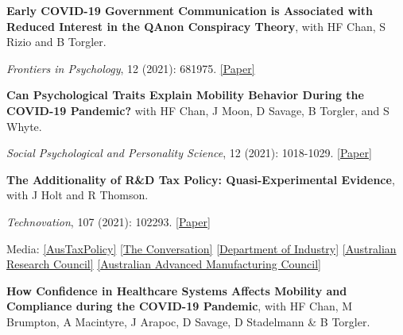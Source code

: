 \documentclass[letterpaper]{article}
\renewenvironment{itemize}{
  \begin{list}{}{
    \setlength{\leftmargin}{1.5em}
  }
}{
  \end{list}
}
\begin{document}
\begin{itemize}
\medskip

	\item \textbf{Early COVID-19 Government Communication is Associated with Reduced Interest in the QAnon Conspiracy Theory}, with HF Chan, S Rizio and B Torgler.
		\vspace{-0.05in}

		\item \textit{Frontiers in Psychology}, 12 (2021): 681975. \href{https://www.frontiersin.org/articles/10.3389/fpsyg.2021.681975/full}{[Paper]}

\medskip
	
		\item \textbf{Can Psychological Traits Explain Mobility Behavior During the COVID-19 Pandemic?} with HF Chan, J Moon, D Savage, B Torgler, and S Whyte. 
	\vspace{-0.05in}
		\item \textit{Social Psychological and Personality Science}, 12 (2021): 1018-1029.  \href{https://psyarxiv.com/5q3jv/}{[Paper]}

\medskip

\item			\textbf{The Additionality of R\&D Tax Policy: Quasi-Experimental Evidence}, with J Holt and R Thomson.  
\vspace{-0.05in}
\item \textit{Technovation}, 107 (2021): 102293. \href{https://doi.org/10.1016/j.technovation.2021.102293}{[Paper]}			 
\begin{itemize}
	\item Media: \href{ https://www.austaxpolicy.com/the-additionality-of-rd-tax-policy-evidence-from-australia/}{[AusTaxPolicy]} \href{https://theconversation.com/randd-tax-incentives-need-to-be-simple-and-underpin-investor-confidence-66273}{[The Conversation]} \href{https://www.industry.gov.au/sites/g/files/net3906/f/May\%202018/document/extra/research-and-development-tax-incentive-review-report-cie_0.pdf}{[Department of Industry]} \href{https://dataportal.arc.gov.au/EI/API/impact-studies/681/pdf}{[Australian Research Council]} \href{http://www.aamc.org.au/rd-study-incentives-double-our-money/}{[Australian Advanced Manufacturing Council]}
\end{itemize}


\medskip
	
	\item \textbf{How Confidence in Healthcare Systems Affects Mobility and Compliance during the COVID-19 Pandemic}, with HF Chan, M Brumpton, A Macintyre, J Arapoc, D Savage, D Stadelmann \& B Torgler. 
	

\end{itemize}
\end{document}
